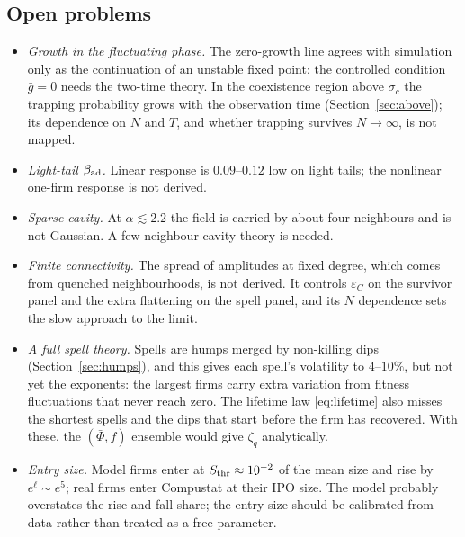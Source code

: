 \documentclass[11pt]{article}
\newcommand{\Sthr}{S_{\rm thr}}
\newcommand{\bPhi}{\bar\Phi}
\newcommand{\bad}{\beta_{\rm ad}}
\begin{document}
\subsection{Open problems}
\label{sec:open}
\begin{itemize}
  \item \emph{Growth in the fluctuating phase.}  The zero-growth line agrees with simulation only
        as the continuation of an unstable fixed point; the controlled condition $\bar g=0$ needs
        the two-time theory.  In the coexistence region above $\sigma_c$ the trapping probability
        grows with the observation time (Section~\ref{sec:above}); its dependence on $N$ and $T$,
        and whether trapping survives $N\to\infty$, is not mapped.
  \item \emph{Light-tail $\bad$.}  Linear response is $0.09$--$0.12$ low on light tails; the
        nonlinear one-firm response is not derived.
  \item \emph{Sparse cavity.}  At $\alpha\lesssim2.2$ the field is carried by about four neighbours
        and is not Gaussian.  A few-neighbour cavity theory is needed.
  \item \emph{Finite connectivity.}  The spread of amplitudes at fixed degree, which comes from
        quenched neighbourhoods, is not derived.  It controls $\varepsilon_C$ on the survivor panel and
        the extra flattening on the spell panel, and its $N$ dependence sets the slow approach to
        the limit.
  \item \emph{A full spell theory.}  Spells are humps merged by non-killing dips
        (Section~\ref{sec:humps}), and this gives each spell's volatility to $4$--$10\%$, but not yet
        the exponents: the largest firms carry extra variation from fitness fluctuations that never
        reach zero.  The lifetime law \eqref{eq:lifetime} also misses the shortest spells and the
        dips that start before the firm has recovered.  With these, the $(\bPhi,f)$ ensemble would
        give $\zeta_q$ analytically.
  \item \emph{Entry size.}  Model firms enter at $\Sthr\approx10^{-2}$ of the mean size and rise by
        $e^\ell\sim e^5$; real firms enter Compustat at their IPO size.  The model probably
        overstates the rise-and-fall share; the entry size should be calibrated from data rather
        than treated as a free parameter.
\end{itemize}

\appendix
\end{document}
